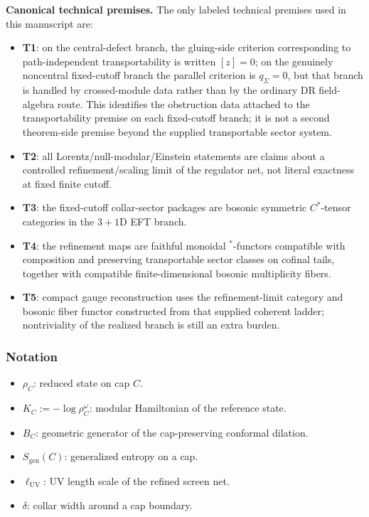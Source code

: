 \textbf{Canonical technical premises.} The only labeled technical premises used in this manuscript are:
\begin{itemize}
\tightlist
\item \textbf{T1}: on the central-defect branch, the gluing-side criterion corresponding to path-independent transportability is written \([z]=0\); on the genuinely noncentral fixed-cutoff branch the parallel criterion is \(q_\Sigma=0\), but that branch is handled by crossed-module data rather than by the ordinary DR field-algebra route. This identifies the obstruction data attached to the transportability premise on each fixed-cutoff branch; it is not a second theorem-side premise beyond the supplied transportable sector system.
\item \textbf{T2}: all Lorentz/null-modular/Einstein statements are claims about a controlled refinement/scaling limit of the regulator net, not literal exactness at fixed finite cutoff.
\item \textbf{T3}: the fixed-cutoff collar-sector packages are bosonic symmetric \(C^*\)-tensor categories in the \(3+1\)D EFT branch.
\item \textbf{T4}: the refinement maps are faithful monoidal \(^*\)-functors compatible with composition and preserving transportable sector classes on cofinal tails, together with compatible finite-dimensional bosonic multiplicity fibers.
\item \textbf{T5}: compact gauge reconstruction uses the refinement-limit category and bosonic fiber functor constructed from that supplied coherent ladder; nontriviality of the realized branch is still an extra burden.
\end{itemize}

\subsubsection{Notation}\label{15-notation}

\begin{itemize}
\tightlist
\item
  \(\rho_C\): reduced state on cap \(C\).
\item
  \(K_C := -\log \rho_C^{\omega}\): modular Hamiltonian of the reference state.
\item
  \(B_C\): geometric generator of the cap-preserving conformal dilation.
\item
  \(S_{\mathrm{gen}}(C)\): generalized entropy on a cap.
\item
  \(\ell_{\mathrm{UV}}\): UV length scale of the refined screen net.
\item
  \(\delta\): collar width around a cap boundary.
\end{itemize}

